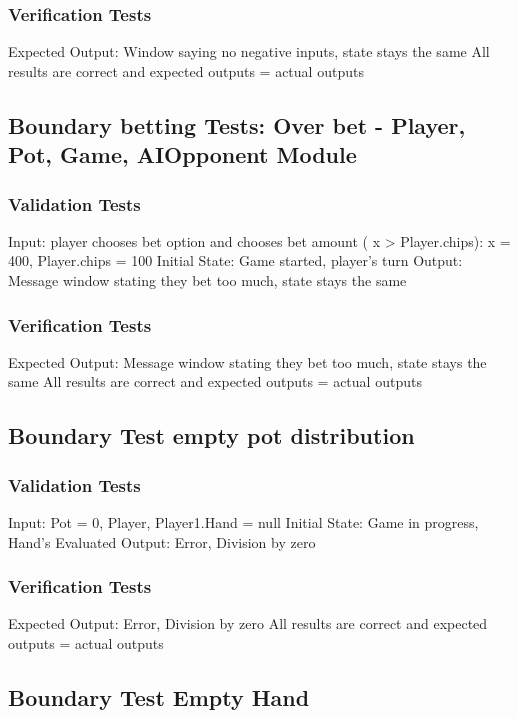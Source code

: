 \documentclass[11pt]{article}
\begin{document}
\subsubsection{Verification Tests}
Expected Output: Window saying no negative inputs, state stays the same
All results are correct and expected outputs = actual outputs

\subsection{Boundary betting Tests: Over bet - Player, Pot, Game, AIOpponent Module}

\subsubsection{Validation Tests}
Input: player chooses bet option and chooses bet amount ( x > Player.chips): x = 400, Player.chips = 100
Initial State: Game started, player's turn
Output: Message window stating they bet too much, state stays the same

\subsubsection{Verification Tests}
Expected Output: Message window stating they bet too much, state stays the same
All results are correct and expected outputs = actual outputs

\subsection{Boundary Test empty pot distribution}

\subsubsection{Validation Tests}
Input: Pot = 0, Player, Player1.Hand = null
Initial State: Game in progress, Hand’s Evaluated
Output: Error, Division by zero

\subsubsection{Verification Tests}
Expected Output: Error, Division by zero
All results are correct and expected outputs = actual outputs

\subsection{Boundary Test Empty Hand}
\end{document}
